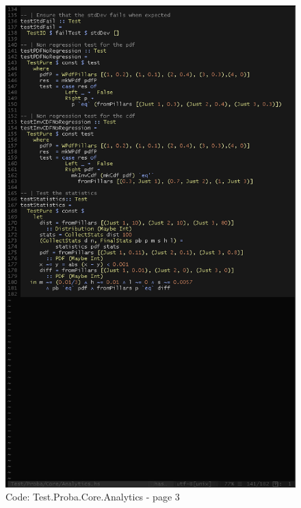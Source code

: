 \documentclass[12pt,a4paper,titlepage]{article}
\begin{document}
\begin{figure}[h!]
\centering
\includegraphics[width=1\textwidth]{img/code-test-analytics-3.png}
\caption{Code: Test.Proba.Core.Analytics - page 3}
\label{fig:test.a3}
\end{figure}
\end{document}
